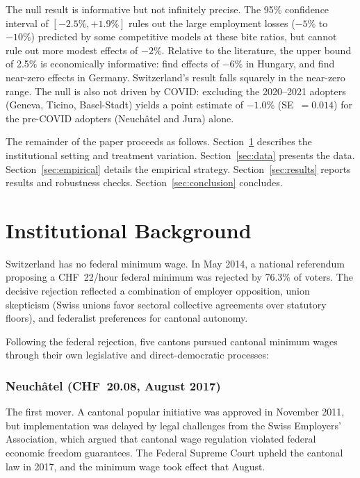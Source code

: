 \documentclass[12pt]{article}
\begin{document}
The null result is informative but not infinitely precise. The 95\% confidence interval of $[-2.5\%, +1.9\%]$ rules out the large employment losses ($-5\%$ to $-10\%$) predicted by some competitive models at these bite ratios, but cannot rule out more modest effects of $-2\%$. Relative to the literature, the upper bound of 2.5\% is economically informative: \citet{harasztosi2019} find effects of $-6\%$ in Hungary, and \citet{dustmann2022} find near-zero effects in Germany. Switzerland's result falls squarely in the near-zero range. The null is also not driven by COVID: excluding the 2020--2021 adopters (Geneva, Ticino, Basel-Stadt) yields a point estimate of $-1.0\%$ (SE~$= 0.014$) for the pre-COVID adopters (Neuch\^atel and Jura) alone.

The remainder of the paper proceeds as follows. Section~\ref{sec:background} describes the institutional setting and treatment variation. Section~\ref{sec:data} presents the data. Section~\ref{sec:empirical} details the empirical strategy. Section~\ref{sec:results} reports results and robustness checks. Section~\ref{sec:conclusion} concludes.

\section{Institutional Background}
\label{sec:background}

Switzerland has no federal minimum wage. In May 2014, a national referendum proposing a CHF~22/hour federal minimum was rejected by 76.3\% of voters. The decisive rejection reflected a combination of employer opposition, union skepticism (Swiss unions favor sectoral collective agreements over statutory floors), and federalist preferences for cantonal autonomy.

Following the federal rejection, five cantons pursued cantonal minimum wages through their own legislative and direct-democratic processes:

\subsubsection*{Neuch\^atel (CHF~20.08, August 2017)} The first mover. A cantonal popular initiative was approved in November 2011, but implementation was delayed by legal challenges from the Swiss Employers' Association, which argued that cantonal wage regulation violated federal economic freedom guarantees. The Federal Supreme Court upheld the cantonal law in 2017, and the minimum wage took effect that August.
\end{document}
